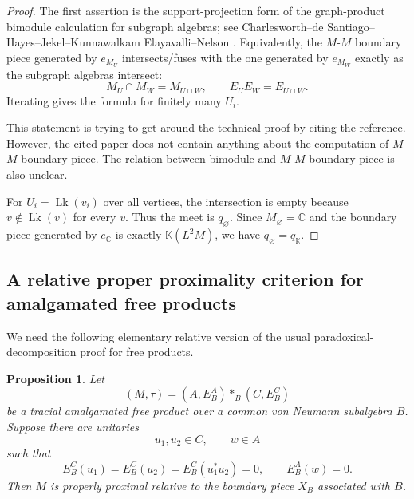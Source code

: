 \documentclass[12pt]{article}
\newtheorem{proposition}[theorem]{Proposition}
\theoremstyle{definition}
\newcommand{\Lk}{\operatorname{Lk}}
\newcommand{\K}{\mathbb K}
\newcommand{\C}{\mathbb C}
\newcommand{\freeprod}{\mathop{*}}
\newcommand{\review}[1]{\begin{reviewbox}#1\end{reviewbox}}
\begin{document}
\begin{proof}
The first assertion is the support-projection form of the graph-product bimodule calculation for subgraph algebras; see Charlesworth--de Santiago--Hayes--Jekel--Kunnawalkam Elayavalli--Nelson \cite[Theorem 0.4, Theorem 5.4, and Proposition 5.5]{CDHJKEN}.  Equivalently, the $M$-$M$ boundary piece generated by $e_{M_U}$ intersects/fuses with the one generated by $e_{M_W}$ exactly as the subgraph algebras intersect:
\[
M_U\cap M_W=M_{U\cap W},
\qquad
E_U E_W=E_{U\cap W}.
\]
Iterating gives the formula for finitely many $U_i$.

\review{This statement is trying to get around the technical proof by citing the reference. However, the cited paper does not contain anything about the computation of $M$-$M$ boundary piece. The relation between bimodule and $M$-$M$ boundary piece is also unclear.}

For $U_i=\Lk(v_i)$ over all vertices, the intersection is empty because $v\notin \Lk(v)$ for every $v$.  Thus the meet is $q_\varnothing$.  Since $M_\varnothing=\C$ and the boundary piece generated by $e_{\C}$ is exactly $\K(L^2M)$, we have $q_\varnothing=q_{\K}$.
\end{proof}

\subsection{A relative proper proximality criterion for amalgamated free products}

We need the following elementary relative version of the usual paradoxical-decomposition proof for free products.

\begin{proposition}\label{prop:AFP}
Let
\[
(M,\tau)=(A,E_B^A)\freeprod_B(C,E_B^C)
\]
be a tracial amalgamated free product over a common von Neumann subalgebra $B$.  Suppose there are unitaries
\[
u_1,u_2\in C,\qquad w\in A
\]
such that
\[
E_B^C(u_1)=E_B^C(u_2)=E_B^C(u_1^*u_2)=0,
\qquad
E_B^A(w)=0.
\]
Then $M$ is properly proximal relative to the boundary piece $X_B$ associated with $B$.
\end{proposition}
\end{document}
